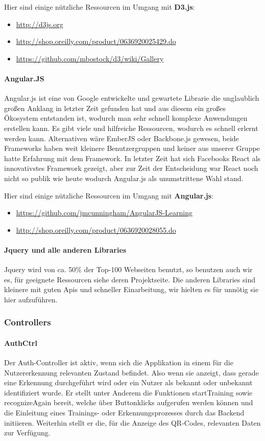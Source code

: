 \documentclass[10pt,a4paper]{report}
\newcommand{\code}[1]{{\fontfamily{cmvtt}\selectfont #1}}
\begin{document}
					Hier sind einige nützliche Ressourcen im Umgang mit \textbf{D3.js}:
					\begin{itemize}
						\item \url{http://d3js.org}
						\item \url{http://shop.oreilly.com/product/0636920025429.do}
						\item \url{https://github.com/mbostock/d3/wiki/Gallery}
					\end{itemize}
				\paragraph{Angular.JS}
					Angular.js ist eine von Google entwickelte und gewartete Librarie die unglaublich großen Anklang in letzter Zeit gefunden hat und aus diesem ein großes Ökosystem entstanden ist,
					wodurch man sehr schnell komplexe Anwendungen erstellen kann. Es gibt viele und hilfreiche Ressourcen, wodurch es schnell erlernt werden kann.
					Alternativen wäre EmberJS oder Backbone.js gewesen, beide Frameworks haben weit kleinere Benutzergruppen und keiner aus unserer Gruppe hatte Erfahrung mit dem Framework.
					In letzter Zeit hat sich Facebooks React als innovativstes Framework gezeigt, aber zur Zeit der Entscheidung war React noch nicht so publik wie heute wodurch Angular.js als unumstrittene Wahl stand.

					Hier sind einige nützliche Ressourcen im Umgang mit \textbf{Angular.js}:
					\begin{itemize}
						\item \url{https://github.com/jmcunningham/AngularJS-Learning} 
						\item \url{http://shop.oreilly.com/product/0636920028055.do} 
					\end{itemize}
				\paragraph{Jquery und alle anderen Libraries}
					Jquery wird von ca. 50\% der Top-100 Webseiten benutzt, so benutzen auch wir es, für geeignete Ressourcen siehe deren Projektseite. Die anderen Libraries sind kleinere mit guten Apis und schneller Einarbeitung, wir hielten es für unnötig sie hier aufzuführen.
			\subsubsection{Controllers}
				\paragraph{AuthCtrl}
					Der Auth-Controller ist aktiv, wenn sich die Applikation in einem für die Nutzererkennung relevanten Zustand befindet. Also wenn sie anzeigt, dass gerade eine Erkennung durchgeführt wird oder ein Nutzer als bekannt oder unbekannt identifiziert wurde. Er stellt unter Anderem die Funktionen \code{startTraining} sowie \code{recognizeAgain} bereit, welche über Buttonklicks aufgerufen werden können und die Einleitung eines Trainings- oder Erkennungsprozesses durch das Backend initiieren. Weiterhin stellt er die, für die Anzeige des QR-Codes, relevanten Daten zur Verfügung.
\end{document}
